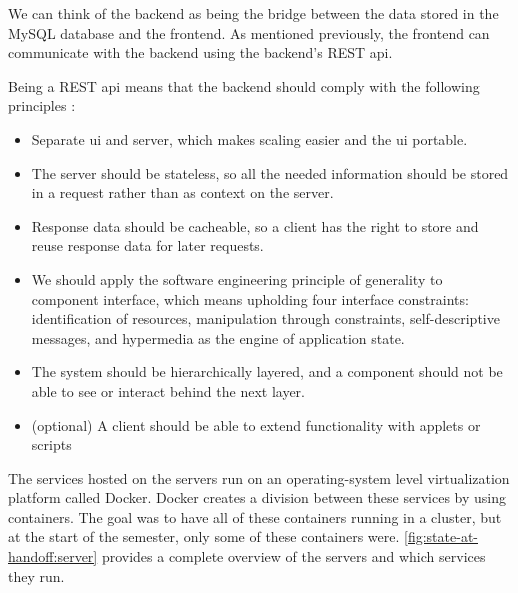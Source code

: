 We can think of the backend as being the bridge between the data stored in the MySQL database and the frontend. As mentioned previously, the frontend can communicate with the backend using the backend's REST \gls{api}.

Being a REST \gls{api} means that the backend should comply with the following principles \cite{REST}:

\begin{itemize}
    \item Separate \gls{ui} and server, which makes scaling easier and the \gls{ui} portable.
    \item The server should be stateless, so all the needed information should be stored in a request rather than as context on the server.
    \item Response data should be cacheable, so a client has the right to store and reuse response data for later requests. 
    \item We should apply the software engineering principle of generality to component interface, which means upholding four interface constraints: identification of resources, manipulation through constraints, self-descriptive messages, and hypermedia as the engine of application state. 
    \item The system should be hierarchically layered, and a component should not be able to see or interact behind the next layer.
    \item (optional) A client should be able to extend functionality with applets or scripts
\end{itemize}

The services hosted on the servers run on an operating-system level virtualization platform called Docker. Docker creates a division between these services by using containers. The goal was to have all of these containers running in a cluster, but at the start of the semester, only some of these containers were. \autoref{fig:state-at-handoff:server} provides a complete overview of the servers and which services they run.

